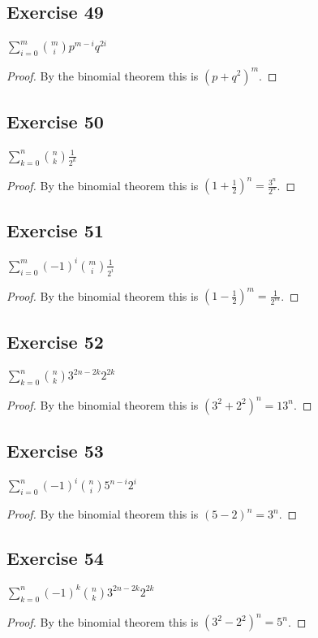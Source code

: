 \documentclass[14pt]{extarticle}
\newcommand{\dps}{\displaystyle}
\begin{document}
\subsection{Exercise 49}
\(\dps \sum_{i=0}^{m} \binom{m}{i} p^{m-i}q^{2i}\)
\begin{proof}
By the binomial theorem this is \((p+q^2)^m\).
\end{proof}

\subsection{Exercise 50}
\(\dps \sum_{k=0}^{n} \binom{n}{k} \frac{1}{2^k}\)
\begin{proof}
By the binomial theorem this is \((1+\frac{1}{2})^n = \frac{3^n}{2^n}\).
\end{proof}

\subsection{Exercise 51}
\(\dps \sum_{i=0}^{m} (-1)^{i} \binom{m}{i} \frac{1}{2^i}\)
\begin{proof}
By the binomial theorem this is \((1-\frac{1}{2})^m = \frac{1}{2^m}\).
\end{proof}

\subsection{Exercise 52}
\(\dps \sum_{k=0}^{n} \binom{n}{k} 3^{2n-2k}2^{2k}\)
\begin{proof}
By the binomial theorem this is \((3^2+2^2)^n = 13^n\).
\end{proof}

\subsection{Exercise 53}
\(\dps \sum_{i=0}^{n} (-1)^i \binom{n}{i} 5^{n-i}2^i\)
\begin{proof}
By the binomial theorem this is \((5-2)^n = 3^n\).
\end{proof}

\subsection{Exercise 54}
\(\dps \sum_{k=0}^{n} (-1)^k \binom{n}{k} 3^{2n-2k}2^{2k}\)
\begin{proof}
By the binomial theorem this is \((3^2-2^2)^n = 5^n\).
\end{proof}
\end{document}
